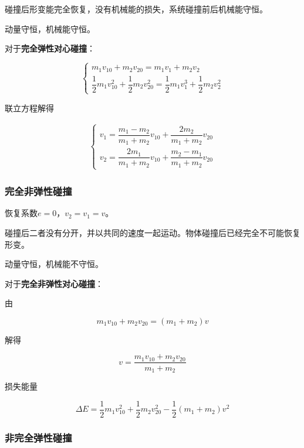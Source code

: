 \documentclass[
	12pt, %
	a4paper, %
]{myLegrandOrangeBook}
\begin{document}
碰撞后形变能完全恢复，没有机械能的损失，系统碰撞前后机械能守恒。

动量守恒，机械能守恒。

对于\textbf{完全弹性对心碰撞}：

$$
    \left\{\begin{array}{l}
    m_1 v_{10}+m_2 v_{20}=m_1 v_1+m_2 v_2 \\
    \dfrac{1}{2} m_1 v_{10}^2+\dfrac{1}{2} m_2 v_{20}^2=\dfrac{1}{2} m_1 v_1^3+\dfrac{1}{2} m_2 v_2^2
    \end{array}\right.
$$

联立方程解得

\begin{align}
    \left\{\begin{array}{l}
        v_1=\dfrac{m_1-m_2}{m_1+m_2} v_{10}+\dfrac{2 m_2}{m_1+m_2} v_{20} \\
        v_2=\dfrac{2 m_1}{m_1+m_2} v_{10}+\dfrac{m_2-m_1}{m_1+m_2} v_{20}
    \end{array}\right.
\end{align}

\subsubsection*{完全非弹性碰撞}

恢复系数\(e=0\)，\(v_2=v_1=v\)。

碰撞后二者没有分开，并以共同的速度一起运动。物体碰撞后已经完全不可能恢复形变。

动量守恒，机械能不守恒。

对于\textbf{完全非弹性对心碰撞}：

由

$$
    m_1 v_{10}+m_2 v_{20}=\left(m_1+m_2\right) v
$$

解得

\begin{equation}
    v=\frac{m_1 v_{10}+m_2 v_{20}}{m_1+m_2}
\end{equation}

损失能量

\begin{equation}
    \Delta E=\frac{1}{2} m_1 v_{10}^2+\frac{1}{2} m_2 v_{20}^2-\frac{1}{2}\left(m_1+m_2\right) v^2
\end{equation}

\subsubsection*{非完全弹性碰撞}
\end{document}
